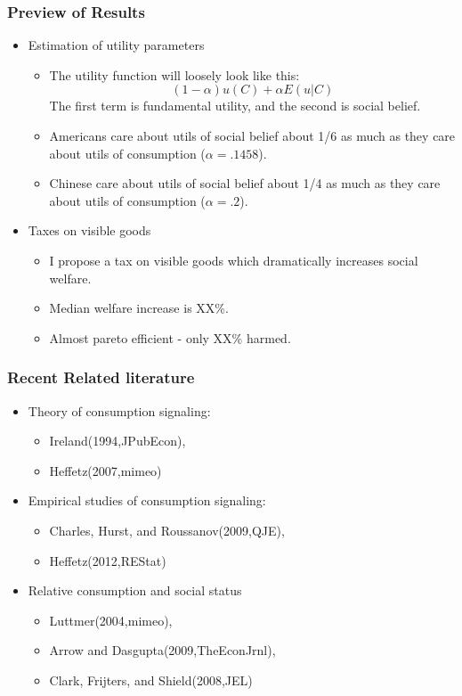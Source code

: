 \documentclass{beamer}
\begin{document}
\begin{frame}
  \frametitle{Preview of Results}
  	\begin{itemize}
           \item Estimation of utility parameters  
	     \begin{itemize}
	       \item The utility function will loosely look like this:
		 \[ 
		   (1-\alpha) u(C) + \alpha E(u|C)
		 \]
	         The first term is fundamental utility, and the second is social belief.
	       \item Americans care about utils of social belief about 1/6 as much as they care about utils of consumption ($\alpha = .1458$).
	       \item Chinese care about utils of social belief about 1/4 as much as they care about utils of consumption ($\alpha = .2$).
	     \end{itemize}
	   \item Taxes on visible goods
	     \begin{itemize}
		\item I propose a tax on visible goods which dramatically increases social welfare.
		\item Median welfare increase is XX\%.
		\item Almost pareto efficient - only XX\% harmed.
	     \end{itemize}
	\end{itemize}
\end{frame}
%
\begin{frame}
  \frametitle{Recent Related literature}
  	\begin{itemize}
           \item Theory of consumption signaling:  
	     \begin{itemize}
	       \item Ireland(1994,JPubEcon),	     
	       \item Heffetz(2007,mimeo)
	     \end{itemize}
	   \item Empirical studies of consumption signaling: 
	     \begin{itemize}
		\item Charles, Hurst, and Roussanov(2009,QJE),
		\item  Heffetz(2012,REStat) 
	     \end{itemize}
	   \item Relative consumption and social status
	     \begin{itemize}
		\item Luttmer(2004,mimeo),
		\item  Arrow and Dasgupta(2009,TheEconJrnl), 
		\item  Clark, Frijters, and Shield(2008,JEL)
	     \end{itemize}
	\end{itemize}
\end{frame}
%
\end{document}
